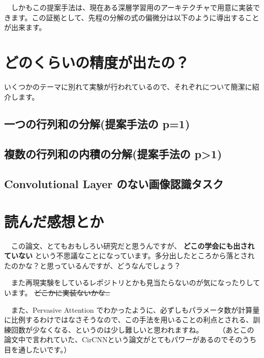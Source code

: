 \documentclass{article}
\begin{document}
　しかもこの提案手法は、現在ある深層学習用のアーキテクチャで用意に実装できます。この証拠として、先程の分解の式の偏微分は以下のように導出することが出来ます。



\section{どのくらいの精度が出たの？}
\label{sec:orge978423}
いくつかのテーマに別れて実験が行われているので、それぞれについて簡潔に紹介します。
\subsection{一つの行列和の分解(提案手法の p=1)}
\label{sec:org386fc18}

\subsection{複数の行列和の内積の分解(提案手法の p>1)}
\label{sec:org85f1c08}

\subsection{Convolutional Layer のない画像認識タスク}
\label{sec:orgfee8be9}

\section{読んだ感想とか}
\label{sec:org1ee2436}
　この論文、とてもおもしろい研究だと思うんですが、 \textbf{どこの学会にも出されていない} という不思議なことになっています。多分出したところから落とされたのかな？と思っているんですが、どうなんでしょう？

　また再現実験をしているレポジトリとかも見当たらないのが気になったりしています。 \sout{どこかに実装ないかな…}

　また、Pervasive Attention でわかったように、必ずしもパラメータ数が計算量に比例するわけではなさそうなので、この手法を用いることの利点とされる、訓練回数が少なくなる、というのは少し難しいと思われますね。
　
　（あとこの論文中で言われていた、CirCNNという論文がとてもパワーがあるのでそのうち目を通したいです。）
\end{document}
